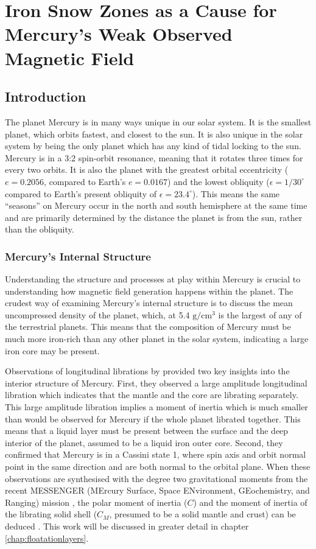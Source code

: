 \chapter{Iron Snow Zones as a Cause for Mercury's Weak Observed Magnetic Field}
\label{chap:doublesnowstates}
\section{Introduction}
The planet Mercury is in many ways unique in our solar system. It is the smallest planet, which orbits fastest, and closest to the sun. It is also unique in the solar system by being the only planet which has any kind of tidal locking to the sun. Mercury is in a 3:2 spin-orbit resonance, meaning that it rotates three times for every two orbits. It is also the planet with the greatest orbital eccentricity ($e=0.2056$, compared to Earth's $e=0.0167$) and the lowest obliquity ($\epsilon=1/30^\circ$ compared to Earth's present obliquity of $\epsilon=23.4^\circ$). This means the same ``seasons'' on Mercury occur in the north and south hemisphere at the same time and are primarily determined by the distance the planet is from the sun, rather than the obliquity.

\subsection{Mercury's Internal Structure}
Understanding the structure and processes at play within Mercury is crucial to understanding how magnetic field generation happens within the planet. The crudest way of examining Mercury's internal structure is to discuss the mean uncompressed density of the planet, which, at 5.4 $\textrm{g}/\textrm{cm}^3$ is the largest of any of the terrestrial planets. This means that the composition of Mercury must be much more iron-rich than any other planet in the solar system, indicating a large iron core may be present. 

Observations of longitudinal librations by \citet{margot2007} provided two key insights into the interior structure of Mercury. First, they observed a large amplitude longitudinal libration which indicates that the mantle and the core are librating separately. This large amplitude libration implies a moment of inertia which is much smaller than would be observed for Mercury if the whole planet librated together. This means that a liquid layer must be present between the surface and the deep interior of the planet, assumed to be a liquid iron outer core. Second, they confirmed that Mercury is in a Cassini state 1, where spin axis and orbit normal point in the same direction and are both normal to the orbital plane. When these observations are synthesised with the degree two gravitational moments from the recent MESSENGER (MErcury Surface, Space ENvironment, GEochemistry, and Ranging) mission \citep{smith2012}, the polar moment of inertia ($C$) and the moment of inertia of the librating solid shell ($C_M$, presumed to be a solid mantle and crust) can be deduced \citep{peale1969}. This work will be discussed in greater detail in chapter \ref{chap:floatationlayers}.

